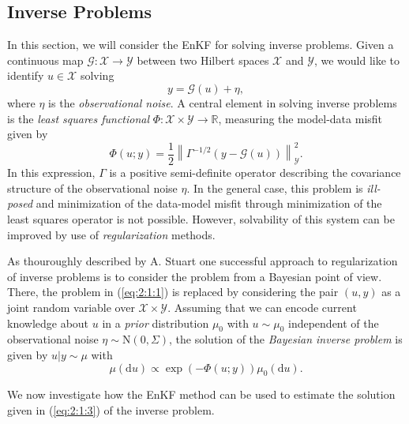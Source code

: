 \documentclass[a4paper,12pt]{elsarticle}
\newcommand{\norm}[1]{\left\lVert#1\right\rVert}
\begin{document}
\subsection{Inverse Problems} \label{subsec:2:1}
In this section, we will consider the EnKF for solving inverse problems. Given a continuous
map $\mathcal{G} : \mathcal{X} \rightarrow \mathcal{Y}$ between two Hilbert spaces $\mathcal{X}$
and $\mathcal{Y}$, we would like to identify $u \in \mathcal{X}$ solving 
\begin{equation} \label{eq:2:1:1}
    y = \mathcal{G}(u) + \eta,
\end{equation}
where $\eta$ is the \textit{observational noise}. A central element in solving inverse problems is the
\textit{least squares functional} $\Phi : \mathcal{X} \times \mathcal{Y} \rightarrow \mathbb{R}$, measuring
the model-data misfit
given by
\begin{equation} \label{eq:2:1:2}
    \Phi(u; y) = \frac12\norm{\Gamma^{-1/2}\left(y - \mathcal{G}(u)\right)}_\mathcal{Y}^2.
\end{equation}
In this expression, $\Gamma$ is a positive semi-definite operator describing the covariance
structure of the observational noise $\eta$. In the general case, this problem is \textit{ill-posed}
and minimization of the data-model misfit through minimization of the least squares operator is not
possible. However, solvability of this system can be improved by use of \textit{regularization} methods.

As thouroughly described by A. Stuart \cite{stuart2010inverse} one successful approach to regularization of inverse problems
is to consider the problem from a Bayesian point of view. There, the problem in (\ref{eq:2:1:1}) is replaced
by considering the pair $(u, y)$ as a joint random variable over $\mathcal{X} \times \mathcal{Y}$. Assuming
that we can encode current knowledge about $u$ in a \textit{prior} distribution $\mu_0$ with $u \sim \mu_0$
independent of the observational noise $\eta \sim \text{N}(0, \Sigma)$, the solution of the
\textit{Bayesian inverse problem} is given by $u|y \sim \mu$ with
\begin{equation} \label{eq:2:1:3}
    \mu(\text{d}u) \propto \exp\left(-\Phi(u; y)\right)\mu_0(\text{d}u).
\end{equation}

We now investigate how the EnKF method can be used to estimate the solution given in (\ref{eq:2:1:3}) of the 
inverse problem.
\end{document}

